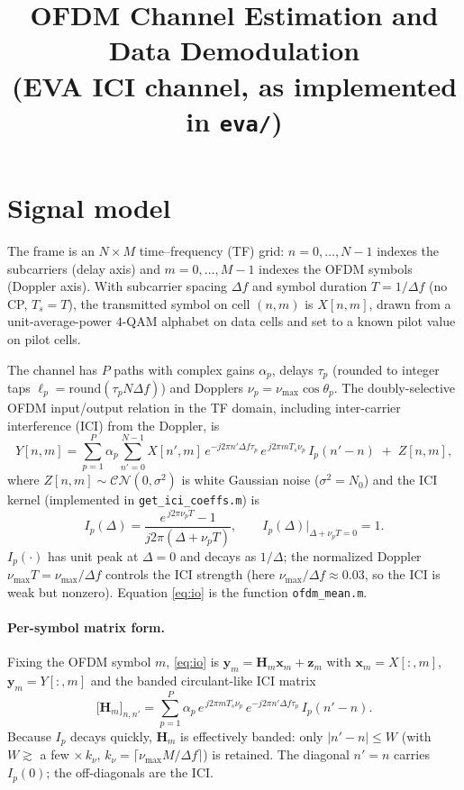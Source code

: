 \documentclass[11pt]{article}
\title{OFDM Channel Estimation and Data Demodulation\\
       (EVA ICI channel, as implemented in \texttt{eva/})}
\author{}
\date{}
\newcommand{\df}{\Delta f}
\newcommand{\CN}{\mathcal{CN}}
\begin{document}
\maketitle

\section{Signal model}

The frame is an $N\times M$ time--frequency (TF) grid: $n=0,\dots,N-1$ indexes the
subcarriers (delay axis) and $m=0,\dots,M-1$ indexes the OFDM symbols (Doppler
axis). With subcarrier spacing $\df$ and symbol duration $T=1/\df$ (no CP,
$T_s=T$), the transmitted symbol on cell $(n,m)$ is $X[n,m]$, drawn from a
unit-average-power $4$-QAM alphabet on data cells and set to a known pilot value
on pilot cells.

The channel has $P$ paths with complex gains $\alpha_p$, delays $\tau_p$
(rounded to integer taps $\ell_p=\mathrm{round}(\tau_p N\df)$) and Dopplers
$\nu_p=\nu_{\max}\cos\theta_p$. The doubly-selective OFDM input/output relation
in the TF domain, including inter-carrier interference (ICI) from the Doppler, is
\begin{equation}
  Y[n,m]=\sum_{p=1}^{P}\alpha_p\sum_{n'=0}^{N-1}
     X[n',m]\,
     e^{-j2\pi n'\df\tau_p}\,
     e^{\,j2\pi m T_s\nu_p}\,
     I_p(n'-n)\;+\;Z[n,m],
  \label{eq:io}
\end{equation}
where $Z[n,m]\sim\CN(0,\sigma^2)$ is white Gaussian noise ($\sigma^2=N_0$) and the
ICI kernel (implemented in \texttt{get\_ici\_coeffs.m}) is
\begin{equation}
  I_p(\Delta)=\frac{e^{\,j2\pi\nu_pT}-1}{j2\pi(\Delta+\nu_pT)},\qquad
  I_p(\Delta)\big|_{\Delta+\nu_pT=0}=1 .
  \label{eq:ici}
\end{equation}
$I_p(\cdot)$ has unit peak at $\Delta=0$ and decays as $1/\Delta$; the normalized
Doppler $\nu_{\max}T=\nu_{\max}/\df$ controls the ICI strength (here
$\nu_{\max}/\df\approx0.03$, so the ICI is weak but nonzero). Equation
\eqref{eq:io} is the function \texttt{ofdm\_mean.m}.

\paragraph{Per-symbol matrix form.} Fixing the OFDM symbol $m$, \eqref{eq:io}
is $\bm y_m=\bm H_m\bm x_m+\bm z_m$ with $\bm x_m=X[:,m]$, $\bm y_m=Y[:,m]$ and
the banded circulant-like ICI matrix
\begin{equation}
  \big[\bm H_m\big]_{n,n'}=\sum_{p=1}^{P}\alpha_p\,
     e^{\,j2\pi m T_s\nu_p}\,
     e^{-j2\pi n'\df\tau_p}\,
     I_p(n'-n).
  \label{eq:Hm}
\end{equation}
Because $I_p$ decays quickly, $\bm H_m$ is effectively banded: only
$|n'-n|\le W$ (with $W\gtrsim$ a few $\times\,k_\nu$, $k_\nu=\lceil\nu_{\max}
M/\df\rceil$) is retained. The diagonal $n'=n$ carries $I_p(0)$; the off-diagonals
are the ICI.
\end{document}
